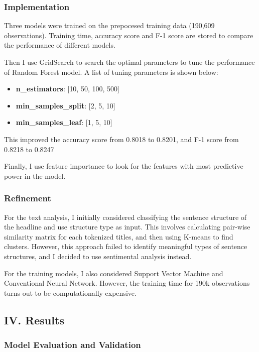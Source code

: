 \documentclass[11pt]{article}
\providecommand{\tightlist}{%
      \setlength{\itemsep}{0pt}\setlength{\parskip}{0pt}}
\begin{document}
\subsubsection{Implementation}\label{implementation}

Three models were trained on the prepocesed training data (190,609
observations). Training time, accuracy score and F-1 score are stored to
compare the performance of different models.

Then I use GridSearch to search the optimal parameters to tune the
performance of Random Forest model. A list of tuning parameters is shown
below:

\begin{itemize}
\tightlist
\item
  \textbf{n\_estimators}: {[}10, 50, 100, 500{]}
\item
  \textbf{min\_samples\_split}: {[}2, 5, 10{]}
\item
  \textbf{min\_samples\_leaf}: {[}1, 5, 10{]}
\end{itemize}

This improved the accuracy score from 0.8018 to 0.8201, and F-1 score
from 0.8218 to 0.8247

Finally, I use feature importance to look for the features with most
predictive power in the model.

\subsubsection{Refinement}\label{refinement}

For the text analysis, I initially considered classifying the sentence
structure of the headline and use structure type as input. This involves
calculating pair-wise similarity matrix for each tokenized titles, and
then using K-means to find clusters. However, this approach failed to
identify meaningful types of sentence structures, and I decided to use
sentimental analysis instead.

For the training models, I also considered Support Vector Machine and
Conventional Neural Network. However, the training time for 190k
observations turns out to be computationally expensive.

\subsection{IV. Results}\label{iv.-results}

\subsubsection{Model Evaluation and
Validation}\label{model-evaluation-and-validation}
\end{document}
